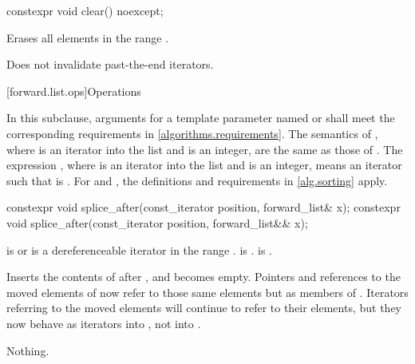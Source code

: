 %
\begin{itemdecl}
constexpr void clear() noexcept;
\end{itemdecl}

\begin{itemdescr}
\pnum
\effects
Erases all elements in the range .

\pnum
\remarks
Does not invalidate past-the-end iterators.
\end{itemdescr}

[forward.list.ops]{Operations}

\pnum
In this subclause,
arguments for a template parameter
named  or 
shall meet the corresponding requirements in \ref{algorithms.requirements}.
The semantics of ,
where  is an iterator into the list and  is an integer,
are the same as those of .
The expression ,
where  is an iterator into the list and  is an integer,
means an iterator  such that  is .
For  and ,
the definitions and requirements in \ref{alg.sorting} apply.

%
\begin{itemdecl}
constexpr void splice_after(const_iterator position, forward_list& x);
constexpr void splice_after(const_iterator position, forward_list&& x);
\end{itemdecl}

\begin{itemdescr}
\pnum
\expects
{} is  or is a dereferenceable
iterator in the range .
 is .
 is .

\pnum
\effects
Inserts the contents of  after
, and  becomes empty. Pointers and references to the moved
elements of  now refer to those same elements but as members of .
Iterators referring to the moved elements will continue to refer to their elements, but
they now behave as iterators into , not into .

\pnum
\throws
Nothing.

\pnum
\complexity
{}
\end{itemdescr}

